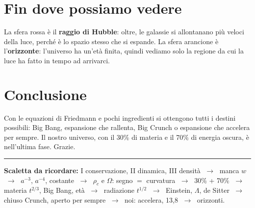\documentclass[12pt,a4paper]{article}
\begin{document}
\section{Fin dove possiamo vedere}
La sfera rossa è il \textbf{raggio di Hubble}: oltre, le galassie si allontanano più veloci della luce, perché è lo spazio stesso che si espande. La sfera arancione è l'\textbf{orizzonte}: l'universo ha un'età finita, quindi vediamo solo la regione da cui la luce ha fatto in tempo ad arrivarci.

\section{Conclusione}
Con le equazioni di Friedmann e pochi ingredienti si ottengono tutti i destini possibili: Big Bang, espansione che rallenta, Big Crunch o espansione che accelera per sempre. Il nostro universo, con il 30\% di materia e il 70\% di energia oscura, è nell'ultima fase. Grazie.

\vspace{6pt}
\hrule
\vspace{4pt}
\textbf{Scaletta da ricordare:} I conservazione, II dinamica, III densità $\;\to\;$ manca $w$ $\;\to\;$ $a^{-3}$, $a^{-4}$, costante $\;\to\;$ $\rho_c$ e $\Omega$: segno $=$ curvatura $\;\to\;$ 30\% + 70\% $\;\to\;$ materia $t^{2/3}$, Big Bang, età $\;\to\;$ radiazione $t^{1/2}$ $\;\to\;$ Einstein, $\Lambda$, de Sitter $\;\to\;$ chiuso Crunch, aperto per sempre $\;\to\;$ noi: accelera, 13,8 $\;\to\;$ orizzonti.
\end{document}
